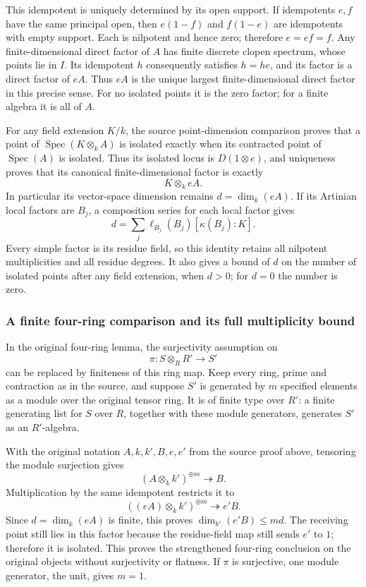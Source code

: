 This idempotent is uniquely determined by its open support. If idempotents \(e,f\) have the same principal open, then \(e(1-f)\) and \(f(1-e)\) are idempotents with empty support. Each is nilpotent and hence zero; therefore \(e=ef=f\). Any finite-dimensional direct factor of \(A\) has finite discrete clopen spectrum, whose points lie in \(I\). Its idempotent \(h\) consequently satisfies \(h=he\), and its factor is a direct factor of \(eA\). Thus \(eA\) is the unique largest finite-dimensional direct factor in this precise sense. For no isolated points it is the zero factor; for a finite algebra it is all of \(A\).

For any field extension \(K/k\), the source point-dimension comparison proves that a point of \(\operatorname{Spec}(K\otimes_k A)\) is isolated exactly when its contracted point of \(\operatorname{Spec}(A)\) is isolated. Thus its isolated locus is \(D(1\otimes e)\), and uniqueness proves that its canonical finite-dimensional factor is exactly \[
 K\otimes_k eA.
\] In particular its vector-space dimension remains \(d=\dim_k(eA)\). If its Artinian local factors are \(B_j\), a composition series for each local factor gives \[
 d=\sum_j\ell_{B_j}(B_j)[\kappa(B_j):K].
\] Every simple factor is its residue field, so this identity retains all nilpotent multiplicities and all residue degrees. It also gives a bound of \(d\) on the number of isolated points after any field extension, when \(d>0\); for \(d=0\) the number is zero.

\subsubsection{A finite four-ring comparison and its full multiplicity bound}\label{algebra-proof-031-a-finite-four-ring-comparison-and-its-full-multiplicity-bound}

In the original four-ring lemma, the surjectivity assumption on \[
 \pi:S\otimes_RR'\longrightarrow S'
\] can be replaced by finiteness of this ring map. Keep every ring, prime and contraction as in the source, and suppose \(S'\) is generated by \(m\) specified elements as a module over the original tensor ring. It is of finite type over \(R'\): a finite generating list for \(S\) over \(R\), together with these module generators, generates \(S'\) as an \(R'\)-algebra.

With the original notation \(A,k,k',B,e,e'\) from the source proof above, tensoring the module surjection gives \[
 (A\otimes_k k')^{\oplus m}\twoheadrightarrow B.
\] Multiplication by the same idempotent restricts it to \[
 ((eA)\otimes_k k')^{\oplus m}\twoheadrightarrow e'B.
\] Since \(d=\dim_k(eA)\) is finite, this proves \(\dim_{k'}(e'B)\le md\). The receiving point still lies in this factor because the residue-field map still sends \(e'\) to \(1\); therefore it is isolated. This proves the strengthened four-ring conclusion on the original objects without surjectivity or flatness. If \(\pi\) is surjective, one module generator, the unit, gives \(m=1\).

